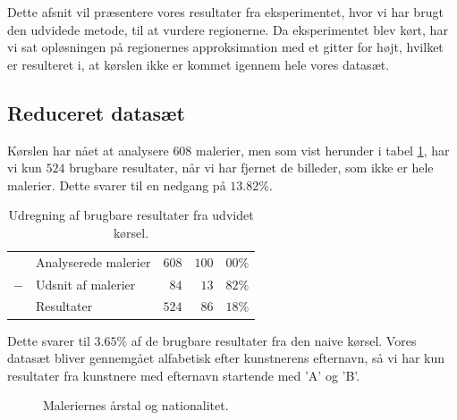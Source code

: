 {
{\sffamily Dette afsnit vil præsentere vores resultater fra
eksperimentet, hvor vi har brugt den udvidede metode, til at vurdere
regionerne. Da eksperimentet blev kørt, har vi sat opløsningen på
regionernes approksimation med et gitter for højt, hvilket er resulteret
i, at kørslen ikke er kommet igennem hele vores datasæt.
}

\subsection{Reduceret datasæt}
Kørslen har nået at analysere $608$ malerier, men som vist herunder i
tabel \ref{ud_tabel_fjern_detaljer}, har vi kun $524$ brugbare
resultater, når vi har fjernet de billeder, som ikke er hele malerier.
Dette svarer til en nedgang på $13.82\%$.

\begin{table}[H]
    \centering
    \begin{tabular}{r@{\ \ }p{12em}r|r@{.}l}
            & Analyserede malerier & $608$ & $100$ & $00\%$   \\
        $-$ & Udsnit af malerier   &  $84$ &  $13$ & $82\%$   \\\hline
            & Resultater           & $524$ &  $86$ & $18\%$
    \end{tabular}
    \caption[]{Udregning af brugbare resultater fra udvidet kørsel.}
    \label{ud_tabel_fjern_detaljer}
\end{table}

Dette svarer til $\mathsf{3.65\%}$ af de brugbare resultater fra den
naive kørsel. Vores datasæt bliver gennemgået alfabetisk efter
kunstnerens efternavn, så vi har kun resultater fra kunstnere med
efternavn startende med 'A' og 'B'.

\begin{figure}[!h]
    \centering
    \hspace{1em}
    \caption[]{Maleriernes årstal og nationalitet.}
    \label{ud_year_nation}
\end{figure}

}
